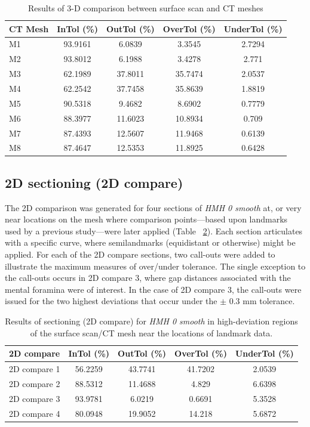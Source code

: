 \documentclass[review]{elsarticle}
\begin{document}
\begin{table}[tbh]\centering
\footnotesize
\caption{Results of 3-D comparison between surface scan and CT meshes}
\centering
\begin{tabular}{lcccc}
\hline
CT Mesh & InTol (\%) & OutTol (\%) & OverTol (\%) & UnderTol (\%)\\
\hline
M1 & 93.9161 & 6.0839 & 3.3545 & 2.7294\\
M2 & 93.8012 & 6.1988 & 3.4278 & 2.771\\
M3 & 62.1989 & 37.8011 & 35.7474 & 2.0537\\
M4 & 62.2542 & 37.7458 & 35.8639 & 1.8819\\
M5 & 90.5318 & 9.4682 & 8.6902 & 0.7779\\
M6 & 88.3977 & 11.6023 & 10.8934 & 0.709\\
M7 & 87.4393 & 12.5607 & 11.9468 & 0.6139\\
M8 & 87.4647 & 12.5353 & 11.8925 & 0.6428\\
\hline
\end{tabular}
\label{tab:Tbl2}
\end{table}

\subsection{2D sectioning (2D compare)}

The 2D comparison was generated for four sections of \textit{HMH 0 smooth} at, or very near locations on the mesh where comparison points---based upon landmarks used by a previous study---were later applied (Table ~\ref{tab:Tbl3}). Each section articulates with a specific curve, where semilandmarks (equidistant or otherwise) might be applied. For each of the 2D compare sections, two call-outs were added to illustrate the maximum measures of over/under tolerance. The single exception to the call-outs occurs in 2D compare 3, where gap distances associated with the mental foramina were of interest. In the case of 2D compare 3, the call-outs were issued for the two highest deviations that occur under the $\pm$ 0.3 mm tolerance.

\begin{table}[tbh]\centering
\footnotesize
\caption{Results of sectioning (2D compare) for \textit{HMH 0 smooth} in high-deviation regions of the surface scan/CT mesh near the locations of landmark data.}
\centering
\begin{tabular}{lcccc}
\hline
2D compare & InTol (\%) & OutTol (\%) & OverTol (\%) & UnderTol (\%)\\
\hline
2D compare 1 & 56.2259 & 43.7741 & 41.7202 & 2.0539\\
2D compare 2 & 88.5312 & 11.4688 & 4.829 & 6.6398\\
2D compare 3 & 93.9781 & 6.0219 & 0.6691 & 5.3528\\
2D compare 4 & 80.0948 & 19.9052 & 14.218 & 5.6872\\
\hline
\end{tabular}
\label{tab:Tbl3}
\end{table}
\end{document}
